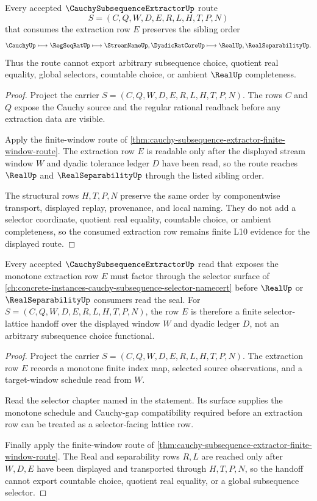 \begin{theorem}
\label{thm:cauchy-subsequence-extractor-sibling-route}
Every accepted $\CauchySubsequenceExtractorUp$ route
$$
S=(C,Q,W,D,E,R,L,H,T,P,N)
$$
that consumes the extraction row $E$ preserves the sibling order
$$
\CauchyUp \longmapsto \RegSeqRatUp \longmapsto \StreamNameUp,\DyadicRatCoreUp \longmapsto \RealUp,\RealSeparabilityUp .
$$
Thus the route cannot export arbitrary subsequence choice, quotient real equality, global selectors, countable choice, or ambient $\RealUp$ completeness.
\end{theorem}
\begin{proof}
Project the carrier $S=(C,Q,W,D,E,R,L,H,T,P,N)$. The rows $C$ and $Q$ expose the Cauchy source and the regular rational readback before any extraction data are visible.

Apply the finite-window route of \autoref{thm:cauchy-subsequence-extractor-finite-window-route}. The extraction row $E$ is readable only after the displayed stream window $W$ and dyadic tolerance ledger $D$ have been read, so the route reaches $\RealUp$ and $\RealSeparabilityUp$ through the listed sibling order.

The structural rows $H,T,P,N$ preserve the same order by componentwise transport, displayed replay, provenance, and local naming. They do not add a selector coordinate, quotient real equality, countable choice, or ambient completeness, so the consumed extraction row remains finite L10 evidence for the displayed route.
\end{proof}

\begin{theorem}
\label{thm:cauchy-subsequence-extractor-selector-lattice-handoff}
Every accepted $\CauchySubsequenceExtractorUp$ read that exposes the monotone extraction row $E$ must factor through the selector surface of \autoref{ch:concrete-instances-cauchy-subsequence-selector-namecert} before $\RealUp$ or $\RealSeparabilityUp$ consumers read the seal. For $S=(C,Q,W,D,E,R,L,H,T,P,N)$, the row $E$ is therefore a finite selector-lattice handoff over the displayed window $W$ and dyadic ledger $D$, not an arbitrary subsequence choice functional.
\end{theorem}
\begin{proof}
Project the carrier $S=(C,Q,W,D,E,R,L,H,T,P,N)$. The extraction row $E$ records a monotone finite index map, selected source observations, and a target-window schedule read from $W$.

Read the selector chapter named in the statement. Its surface supplies the monotone schedule and Cauchy-gap compatibility required before an extraction row can be treated as a selector-facing lattice row.

Finally apply the finite-window route of \autoref{thm:cauchy-subsequence-extractor-finite-window-route}. The Real and separability rows $R,L$ are reached only after $W,D,E$ have been displayed and transported through $H,T,P,N$, so the handoff cannot export countable choice, quotient real equality, or a global subsequence selector.
\end{proof}

